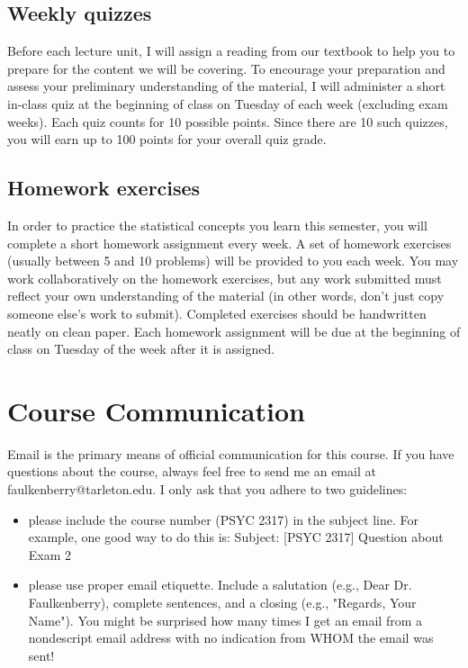 \documentclass[10pt]{article}
\begin{document}
\subsection*{Weekly quizzes}
\label{sec:orgfd97f36}
Before each lecture unit, I will assign a reading from our textbook to help you to prepare for the content we will be covering. To encourage your preparation and assess your preliminary understanding of the material, I will administer a short in-class quiz at the beginning of class on Tuesday of each week (excluding exam weeks). Each quiz counts for 10 possible points.  Since there are 10 such quizzes, you will earn up to 100 points for your overall quiz grade.

\subsection*{Homework exercises}
\label{sec:org66a434b}
In order to practice the statistical concepts you learn this semester, you will complete a short homework assignment every week.  A set of homework exercises (usually between 5 and 10 problems) will be provided to you each week.  You may work collaboratively on the homework exercises, but any work submitted must reflect your own understanding of the material (in other words, don't just copy someone else's work to submit).  Completed exercises should be handwritten neatly on clean paper.  Each homework assignment will be due at the beginning of class on Tuesday of the week after it is assigned.

\section*{Course Communication}
\label{sec:org146911b}

Email is the primary means of official communication for this course.  If you have questions about the course, always feel free to send me an email at faulkenberry@tarleton.edu.  I only ask that you adhere to two guidelines:
\begin{itemize}
\item please include the course number (PSYC 2317) in the subject line.  For example, one good way to do this is:  Subject: [PSYC 2317] Question about Exam 2
\item please use proper email etiquette.  Include a salutation (e.g., Dear Dr. Faulkenberry), complete sentences, and a closing (e.g., "Regards, Your Name").  You might be surprised how many times I get an email from a nondescript email address with no indication from WHOM the email was sent!
\end{itemize}
\end{document}
